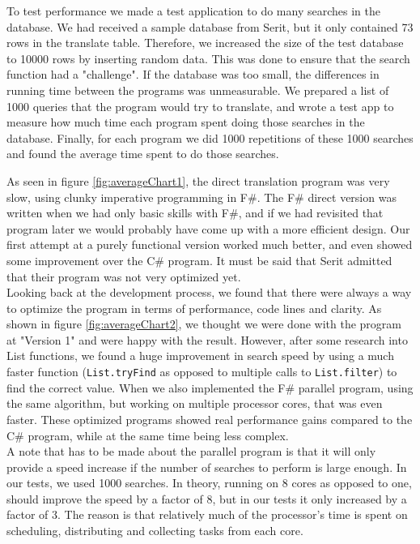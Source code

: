 \documentclass[12pt, a4paper]{article}
\newcommand{\code}[1]{{\small \texttt{#1}}}
\begin{document}
To test performance we made a test application to do many searches in the database. We had received a sample database from Serit, but it only contained 73 rows in the translate table. Therefore, we increased the size of the test database to 10000 rows by inserting random data. This was done to ensure that the search function had a "challenge". If the database was too small, the differences in running time between the programs was unmeasurable. We prepared a list of 1000 queries that the program would try to translate, and wrote a test app to measure how much time each program spent doing those searches in the database. Finally, for each program we did 1000 repetitions of these 1000 searches and found the average time spent to do those searches.\\

\newpage

As seen in figure \ref{fig:averageChart1}, the direct translation program was very slow, using clunky imperative programming in F\#. The F\# direct version was written when we had only basic skills with F\#, and if we had revisited that program later we would probably have come up with a more efficient design. Our first attempt at a purely functional version worked much better, and even showed some improvement over the C\# program. It must be said that Serit admitted that their program was not very optimized yet.\\

Looking back at the development process, we found that there were always a way to optimize the program in terms of performance, code lines and clarity. As shown in figure \ref{fig:averageChart2}, we thought we were done with the program at "Version 1" and were happy with the result. However, after some research into List functions, we found a huge improvement in search speed by using a much faster function (\code{List.tryFind} as opposed to multiple calls to \code{List.filter}) to find the correct value. When we also implemented the F\# parallel program, using the same algorithm, but working on multiple processor cores, that was even faster. These optimized programs showed real performance gains compared to the C\# program, while at the same time being less complex.\\

A note that has to be made about the parallel program is that it will only provide a speed increase if the number of searches to perform is large enough. In our tests, we used 1000 searches. In theory, running on 8 cores as opposed to one, should improve the speed by a factor of 8, but in our tests it only increased by a factor of 3. The reason is that relatively much of the processor's time is spent on scheduling, distributing and collecting tasks from each core.\\
\end{document}
